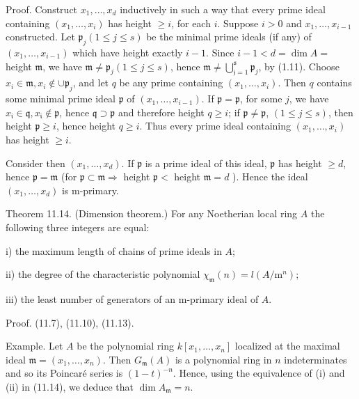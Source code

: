 \documentclass{standalone}
\theoremstyle{definition}
\theoremstyle{remark}
\begin{document}
Proof. Construct $x_{1}, \ldots, x_{d}$ inductively in such a way that every prime ideal containing $\left(x_{1}, \ldots, x_{i}\right)$ has height $\geqslant i$, for each $i$. Suppose $i>0$ and $x_{1}, \ldots, x_{i-1}$ constructed. Let $\mathfrak{p}_{j}(1 \leqslant j \leqslant s)$ be the minimal prime ideals (if any) of $\left(x_{1}, \ldots, x_{i-1}\right)$ which have height exactly $i-1$. Since $i-1<d=\operatorname{dim} A=$ height $\mathfrak{m}$, we have $\mathfrak{m} \neq \mathfrak{p}_{j}(1 \leqslant j \leqslant s)$, hence $\mathfrak{m} \neq \bigcup_{\mathfrak{j}=1}^{\mathfrak{s}} \mathfrak{p}_{j}$, by (1.11). Choose $x_{i} \in \mathfrak{m}, x_{i} \notin \cup \mathfrak{p}_{j}$, and let $q$ be any prime containing $\left(x_{1}, \ldots, x_{i}\right)$. Then $q$ contains some minimal prime ideal $\mathfrak{p}$ of $\left(x_{1}, \ldots, x_{i-1}\right)$. If $\mathfrak{p}=\mathfrak{p}$, for some $j$, we have $x_{\mathfrak{i}} \in \mathfrak{q}, x_{\mathfrak{i}} \notin \mathfrak{p}$, hence $\mathfrak{q} \supset \mathfrak{p}$ and therefore height $q \geqslant i$; if $\mathfrak{p} \neq \mathfrak{p}$, $(1 \leqslant j \leqslant s)$, then height $\mathfrak{p} \geqslant i$, hence height $q \geqslant i$. Thus every prime ideal containing $\left(x_{1}, \ldots, x_{i}\right)$ has height $\geqslant i$.

Consider then $\left(x_{1}, \ldots, x_{d}\right)$. If $\mathfrak{p}$ is a prime ideal of this ideal, $\mathfrak{p}$ has height $\geqslant d$, hence $\mathfrak{p}=\mathfrak{m}$ (for $\mathfrak{p} \subset \mathfrak{m} \Rightarrow$ height $\mathfrak{p}<$ height $\mathfrak{m}=d$ ). Hence the ideal $\left(x_{1}, \ldots, x_{d}\right)$ is m-primary.

Theorem 11.14. (Dimension theorem.) For any Noetherian local ring $A$ the following three integers are equal:

i) the maximum length of chains of prime ideals in $A$;

ii) the degree of the characteristic polynomial $\chi_{\mathfrak{m}}(n)=l\left(A / \mathrm{m}^{n}\right)$;

iii) the least number of generators of an $\mathrm{m}$-primary ideal of $A$.

Proof. (11.7), (11.10), (11.13).

Example. Let $A$ be the polynomial ring $k\left[x_{1}, \ldots, x_{n}\right]$ localized at the maximal ideal $\mathfrak{m}=\left(x_{1}, \ldots, x_{n}\right)$. Then $G_{\mathfrak{m}}(A)$ is a polynomial ring in $n$ indeterminates and so its Poincaré series is $(1-t)^{-n}$. Hence, using the equivalence of (i) and (ii) in (11.14), we deduce that $\operatorname{dim} A_{\mathfrak{m}}=n$.
\end{document}
